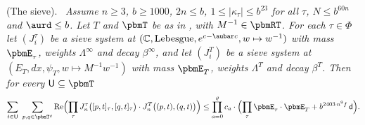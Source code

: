 \documentclass[10pt]{amsart}
\theoremstyle{definition}
\theoremstyle{remark}
\newcommand{\C}{\mathbb C}
\newcommand{\Rel}{\operatorname{Re}}
\providecommand{\auPl}{\Phi}
\providecommand{\pbmdec}{\mathsf d}
\newenvironment{quotedthm}[2]{\par\medskip\noindent\begingroup
  \textbf{#1}#2.\ \itshape\ignorespaces}{\endgroup\par\medskip}
\begin{document}
\begin{quotedthm}{\cite[Theorem~3.50]{P51}}{ (The sieve)}
Assume $n\ge3$, $b\ge1000$, $2n\le b$, $1\le|\kappa_\tau|\le b^{23}$ for all $\tau$, $N\le b^{60n}$
and $\aurd\le b$. Let $T$ and $\pbmT$ be as in {\cite[Theorem~3.48]{P51}}, with $M^{-1}\in\pbmRT$. For
each $\tau\in\auPl$ let $(J^\tau_i)$ be a sieve system at $(\C,\text{Lebesgue},e^{c-\aubar c},w\mapsto
w^{-1})$ with mass $\pbmE_\tau$, weights $\Lambda^\infty$ and decay $\beta^\infty$, and let $(J^T_i)$
be a sieve system at $(E_T,dx,\psi_T,w\mapsto M^{-1}w^{-1})$ with mass $\pbmE_T$, weights $\Lambda^T$
and decay $\beta^T$. Then for every $\mathsf U\subseteq\pbmT$
\[
\sum_{t\in\mathsf U}\ \sum_{p,q\in\pbmT^\varrho}\Rel\Bigl(\prod_\tau J^\tau_n\bigl([p,t]_\tau,[q,t]_\tau
\bigr)\cdot J^T_n\bigl((p,t),(q,t)\bigr)\Bigr)\le\prod_{a=0}^{\varrho}c_a\cdot\Bigl(\prod_\tau\pbmE_\tau
\cdot\pbmE_T+b^{2403\,n^9f}\,\pbmdec\Bigr).
\]
\end{quotedthm}
\end{document}
